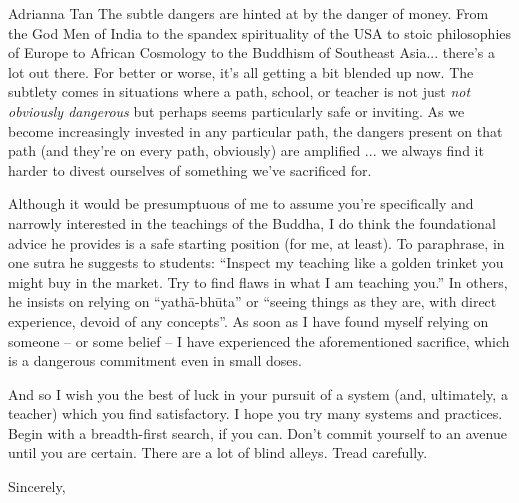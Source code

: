 \documentclass{letter}
\newcommand\hr{\par\vspace{-.5\ht\strutbox}\noindent\hrulefill\par}
\begin{document}
\begin{letter}{Adrianna Tan}
The subtle dangers are hinted at by the danger of money.
From the God Men of India to the spandex spirituality of the USA to stoic philosophies of Europe to African Cosmology to the Buddhism of Southeast Asia... there's a lot out there.
For better or worse, it's all getting a bit blended up now.
The subtlety comes in situations where a path, school, or teacher is not just \textit{not obviously dangerous} but perhaps seems particularly safe or inviting.
As we become increasingly invested in any particular path, the dangers present on that path (and they're on every path, obviously) are amplified ... we always find it harder to divest ourselves of something we've sacrificed for.

Although it would be presumptuous of me to assume you're specifically and narrowly interested in the teachings of the Buddha, I do think the foundational advice he provides is a safe starting position (for me, at least).
To paraphrase, in one sutra he suggests to students: ``Inspect my teaching like a golden trinket you might buy in the market. Try to find flaws in what I am teaching you.''
In others, he insists on relying on ``yathā-bhūta'' or ``seeing things as they are, with direct experience, devoid of any concepts''.
As soon as I have found myself relying on someone -- or some belief -- I have experienced the aforementioned sacrifice, which is a dangerous commitment even in small doses.

\hr

And so I wish you the best of luck in your pursuit of a system (and, ultimately, a teacher) which you find satisfactory.
I hope you try many systems and practices.
Begin with a breadth-first search, if you can.
Don't commit yourself to an avenue until you are certain.
There are a lot of blind alleys.
Tread carefully.

\closing{Sincerely,}


\end{letter}
\end{document}
